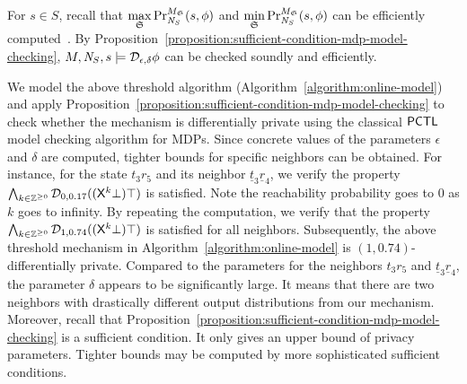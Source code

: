 For $s \in S$, recall that $\max\limits_{\scheduler{S}}
\myPr{s}{M_{\scheduler{S}}}{\neighbor{S}}{\phi}$ and
$\min\limits_{\scheduler{S}}
\myPr{s}{M_{\scheduler{S}}}{\neighbor{S}}{\phi}$ can be efficiently 
computed~\cite{BK:08:PMC}. 
By
Proposition~\ref{proposition:sufficient-condition-mdp-model-checking},
$M, \neighbor{S}, s \models \dpriv{\epsilon}{\delta} \phi$ can be
checked soundly and efficiently.

We model the above threshold algorithm (Algorithm~\ref{algorithm:online-model})
and apply
Proposition~\ref{proposition:sufficient-condition-mdp-model-checking} 
to check whether the mechanism is differentially private using the
classical $\PCTL$ model checking algorithm for MDPs. 
Since concrete values of the parameters $\epsilon$ and $\delta$ are
computed, tighter bounds for specific neighbors can be obtained.
For instance, for the state $t_3r_5$ and its neighbor
$\underline{t}_3\underline{r}_4$, we verify the property $\bigwedge_{k
  \in \bbfZ^{\geq 0}} \dpriv{0}{0.17} ((\X^k\bot) \top)$ is
satisfied. Note the reachability probability goes to $0$ as $k$ goes
to infinity. By repeating the computation, we verify that 
the property $\bigwedge_{k \in \bbfZ^{\geq 0}} \dpriv{1}{0.74}
((\X^k\bot) \top)$ is satisfied for all neighbors. 
Subsequently, the above threshold mechanism in
Algorithm~\ref{algorithm:online-model} is $(1, 0.74)$-differentially
private. Compared to the parameters for the neighbors $t_3r_5$ and
$\underline{t}_3\underline{r}_4$, the parameter $\delta$ appears to be
significantly large. It means that there are two neighbors with
drastically different output distributions from our mechanism.
Moreover, recall that
Proposition~\ref{proposition:sufficient-condition-mdp-model-checking}
is a sufficient condition. It only gives an upper bound of privacy
parameters. Tighter bounds may be computed by more sophisticated
sufficient conditions.

